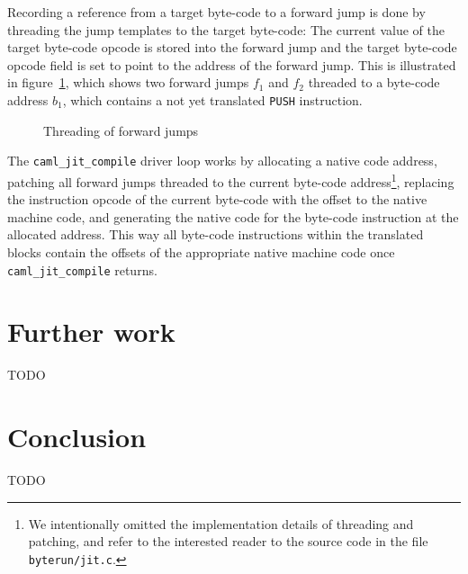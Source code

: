 \documentclass[a4paper]{acm_proc_article-sp}
\begin{document}
Recording a reference from a target byte-code to a forward jump is done by threading the
jump templates to the target byte-code: The current value of the target byte-code opcode
is stored into the forward jump and the target byte-code opcode field is set to point
to the address of the forward jump. This is illustrated in figure~\ref{figure:Threading_of_forward_jumps},
which shows two forward jumps $f_1$ and $f_2$ threaded to a byte-code address $b_1$,
which contains a not yet translated \texttt{PUSH} instruction.

\begin{figure}[htb]
  \centering
  \caption{Threading of forward jumps}
  \label{figure:Threading_of_forward_jumps}
\end{figure}

The \texttt{caml\_jit\_compile} driver loop works by allocating a native code address,
patching all forward jumps threaded to the current byte-code address\footnote{We intentionally
omitted the implementation details of threading and patching, and refer to the interested
reader to the source code in the file \texttt{byterun/jit.c}.}, replacing the
instruction opcode of the current byte-code with the offset to the native machine code,
and generating the native code for the byte-code instruction at the allocated address.
This way all byte-code instructions within the translated blocks contain the offsets
of the appropriate native machine code once \texttt{caml\_jit\_compile} returns.


\section{Further work}

TODO


\section{Conclusion}

TODO




\end{document}
